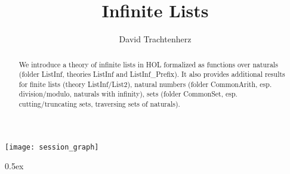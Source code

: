 \documentclass[11pt,a4paper]{article}
\begin{document}
\title{Infinite Lists}
\author{David Trachtenherz}
\maketitle

\begin{abstract}
We introduce a theory of infinite lists in HOL formalized as functions
over naturals (folder ListInf, theories ListInf and
ListInf\_Prefix). It also provides additional results for finite lists
(theory ListInf/List2), natural numbers (folder CommonArith,
esp. division/modulo, naturals with infinity), sets (folder CommonSet,
esp. cutting/truncating sets, traversing sets of naturals).
\end{abstract}

\tableofcontents

\begin{center}
  \texttt{[image: session\_graph]}
\end{center}

\clearpage

\parindent 0pt\parskip 0.5ex

\end{document}
